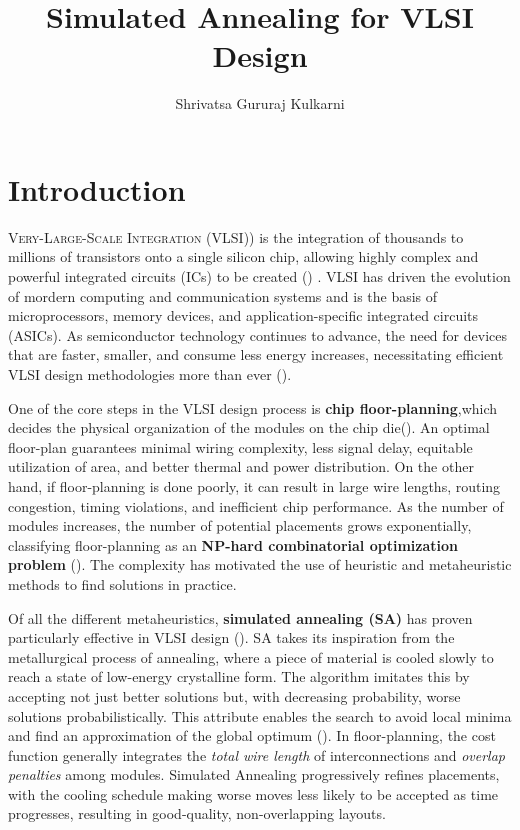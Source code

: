 \documentclass[9pt,a4paper,twoside]{rho-class/rho}
\title{Simulated Annealing for VLSI Design}
\author{Shrivatsa Gururaj Kulkarni}
\begin{document}
	
    \maketitle
    \thispagestyle{firststyle}
    \linenumbers


\section{Introduction}

\lettrine{V}{ery-Large-Scale Integration (VLSI)}) is the integration of thousands to millions of transistors onto a single silicon chip, allowing highly complex and powerful integrated circuits (ICs) to be created (\cite{chen2011,ictact2016}) . VLSI has driven the evolution of mordern computing and communication systems and is the basis of microprocessors, memory devices, and application-specific integrated circuits (ASICs). As semiconductor technology continues to advance, the need for devices that are faster, smaller, and consume less energy increases, necessitating efficient VLSI design methodologies more than ever (\cite{chen2005,ictact2016}).  

One of the core steps in the VLSI design process is \textbf{chip floor-planning},which decides the physical organization of the modules on the chip die(\cite{chen2005}). An optimal floor-plan guarantees minimal wiring complexity, less signal delay, equitable utilization of area, and better thermal and power distribution. On the other hand, if floor-planning is done poorly, it can result in large wire lengths, routing congestion, timing violations, and inefficient chip performance. As the number of modules increases, the number of potential placements grows exponentially, classifying floor-planning as an \textbf{NP-hard combinatorial optimization problem} (\cite{kirkpatrick1983,chen2011}).  The complexity has motivated the use of heuristic and metaheuristic methods to find solutions in practice.

Of all the different metaheuristics, \textbf{simulated annealing (SA)} has proven particularly effective in VLSI design (\cite{kirkpatrick1983}). SA takes its inspiration from the metallurgical process of annealing, where a piece of material is cooled slowly to reach a state of low-energy crystalline form. The algorithm imitates this by accepting not just better solutions but, with decreasing probability, worse solutions probabilistically. This attribute enables the search to avoid local minima and find an approximation of the global optimum (\cite{chen2011,fang2009}). In floor-planning, the cost function generally integrates the \textit{total wire length} of interconnections and \textit{overlap penalties} among modules. Simulated Annealing progressively refines placements, with the cooling schedule making worse moves less likely to be accepted as time progresses, resulting in good-quality, non-overlapping layouts.
\end{document}
